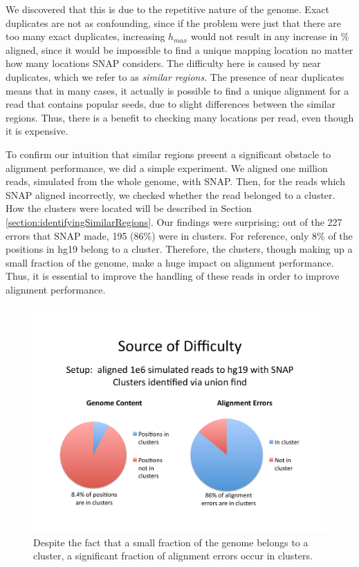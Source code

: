 \documentclass[twocolumn,10pt]{article}
\begin{document}
We discovered that this is due to the repetitive nature of the genome.  Exact duplicates are not as confounding, since if the problem were just that there are too many exact duplicates, increasing \(h_{max}\) would not result in any increase in \% aligned, since it would be impossible to find a unique mapping location no matter how many locations SNAP considers.  The difficulty here is caused by near duplicates, which we refer to as \textit{similar regions}.  The presence of near duplicates means that in many cases, it actually is possible to find a unique alignment for a read that contains popular seeds, due to slight differences between the similar regions.  Thus, there is a benefit to checking many locations per read, even though it is expensive.

To confirm our intuition that similar regions present a significant obstacle to alignment performance, we did a simple experiment.  We aligned one million reads, simulated from the whole genome, with SNAP.  Then, for the reads which SNAP aligned incorrectly, we checked whether the read belonged to a cluster.  How the clusters were located will be described in Section \ref{section:identifyingSimilarRegions}.  Our findings were surprising; out of the 227 errors that SNAP made, 195 (86\%) were in clusters.  For reference, only 8\% of the positions in hg19 belong to a cluster.  Therefore, the clusters, though making up a small fraction of the genome, make a huge impact on alignment performance.  Thus, it is essential to improve the handling of these reads in order to improve alignment performance.

\begin{figure}
\centering
\includegraphics[scale=0.6]{errorsInClusters.pdf}
\caption{Despite the fact that a small fraction of the genome belongs to a cluster, a significant fraction of alignment errors occur in clusters.}
\label{fig:errorsInClusters}
\end{figure}
\end{document}
